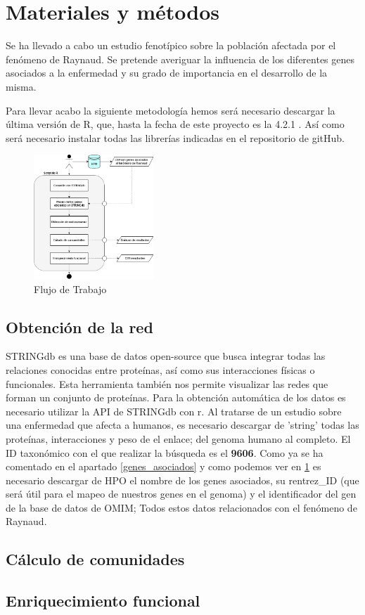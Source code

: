\section{Materiales y métodos}

Se ha llevado a cabo un estudio fenotípico sobre la población afectada por el fenómeno de Raynaud. Se pretende averiguar la influencia de los diferentes genes asociados a la enfermedad y su grado de importancia en el desarrollo de la misma.

Para llevar acabo la siguiente metodología hemos será necesario descargar la última versión de R, que, hasta la fecha de este proyecto es la 4.2.1 . Así como será necesario instalar todas las librerías indicadas en el repositorio de gitHub.

\begin{figure}
	\centering
	\includegraphics[width=0.4\textwidth]{figures/Workflow_genes.PNG}
	\caption{Flujo de Trabajo}
	\label{workflow}
\end{figure}

\subsection{Obtención de la red}

STRINGdb es una base de datos open-source que busca integrar todas las relaciones conocidas entre proteínas, así como sus interacciones físicas o funcionales. Esta herramienta también nos permite visualizar las redes que forman un conjunto de proteínas. Para la obtención automática de los datos es necesario utilizar la API de STRINGdb con r. Al tratarse de un estudio sobre una enfermedad que afecta a humanos, es necesario descargar de 'string' todas las proteínas, interacciones y peso de el enlace; del genoma humano al completo. El ID taxonómico con el que realizar la búsqueda es el \textbf{9606}. Como ya se ha comentado en el apartado \ref{genes_asociados} y como podemos ver en \ref{workflow} es necesario descargar de HPO el nombre de los genes asociados, su rentrez\_ID (que será útil para el mapeo de nuestros genes en el genoma) y el identificador del gen de la base de datos de OMIM; Todos estos datos relacionados con el fenómeno de Raynaud.

\subsection{Cálculo de comunidades}
\subsection{Enriquecimiento funcional}
